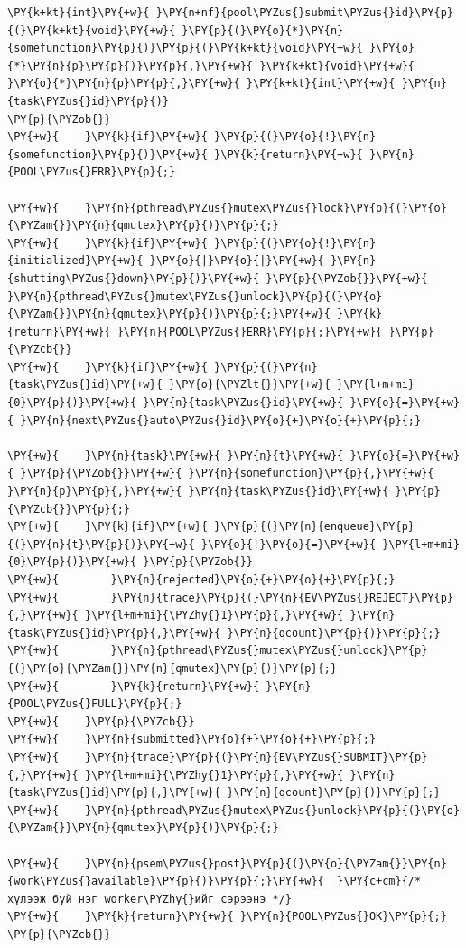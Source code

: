 \documentclass[12pt,a4paper]{article}
\begin{document}
\par\noindent\begin{minipage}{\linewidth}\setlength{\topsep}{1pt}\setlength{\partopsep}{0pt}
\label{lst:submit}
\begin{Verbatim}[commandchars=\\\{\}]
\PY{k+kt}{int}\PY{+w}{ }\PY{n+nf}{pool\PYZus{}submit\PYZus{}id}\PY{p}{(}\PY{k+kt}{void}\PY{+w}{ }\PY{p}{(}\PY{o}{*}\PY{n}{somefunction}\PY{p}{)}\PY{p}{(}\PY{k+kt}{void}\PY{+w}{ }\PY{o}{*}\PY{n}{p}\PY{p}{)}\PY{p}{,}\PY{+w}{ }\PY{k+kt}{void}\PY{+w}{ }\PY{o}{*}\PY{n}{p}\PY{p}{,}\PY{+w}{ }\PY{k+kt}{int}\PY{+w}{ }\PY{n}{task\PYZus{}id}\PY{p}{)}
\PY{p}{\PYZob{}}
\PY{+w}{    }\PY{k}{if}\PY{+w}{ }\PY{p}{(}\PY{o}{!}\PY{n}{somefunction}\PY{p}{)}\PY{+w}{ }\PY{k}{return}\PY{+w}{ }\PY{n}{POOL\PYZus{}ERR}\PY{p}{;}

\PY{+w}{    }\PY{n}{pthread\PYZus{}mutex\PYZus{}lock}\PY{p}{(}\PY{o}{\PYZam{}}\PY{n}{qmutex}\PY{p}{)}\PY{p}{;}
\PY{+w}{    }\PY{k}{if}\PY{+w}{ }\PY{p}{(}\PY{o}{!}\PY{n}{initialized}\PY{+w}{ }\PY{o}{|}\PY{o}{|}\PY{+w}{ }\PY{n}{shutting\PYZus{}down}\PY{p}{)}\PY{+w}{ }\PY{p}{\PYZob{}}\PY{+w}{ }\PY{n}{pthread\PYZus{}mutex\PYZus{}unlock}\PY{p}{(}\PY{o}{\PYZam{}}\PY{n}{qmutex}\PY{p}{)}\PY{p}{;}\PY{+w}{ }\PY{k}{return}\PY{+w}{ }\PY{n}{POOL\PYZus{}ERR}\PY{p}{;}\PY{+w}{ }\PY{p}{\PYZcb{}}
\PY{+w}{    }\PY{k}{if}\PY{+w}{ }\PY{p}{(}\PY{n}{task\PYZus{}id}\PY{+w}{ }\PY{o}{\PYZlt{}}\PY{+w}{ }\PY{l+m+mi}{0}\PY{p}{)}\PY{+w}{ }\PY{n}{task\PYZus{}id}\PY{+w}{ }\PY{o}{=}\PY{+w}{ }\PY{n}{next\PYZus{}auto\PYZus{}id}\PY{o}{+}\PY{o}{+}\PY{p}{;}

\PY{+w}{    }\PY{n}{task}\PY{+w}{ }\PY{n}{t}\PY{+w}{ }\PY{o}{=}\PY{+w}{ }\PY{p}{\PYZob{}}\PY{+w}{ }\PY{n}{somefunction}\PY{p}{,}\PY{+w}{ }\PY{n}{p}\PY{p}{,}\PY{+w}{ }\PY{n}{task\PYZus{}id}\PY{+w}{ }\PY{p}{\PYZcb{}}\PY{p}{;}
\PY{+w}{    }\PY{k}{if}\PY{+w}{ }\PY{p}{(}\PY{n}{enqueue}\PY{p}{(}\PY{n}{t}\PY{p}{)}\PY{+w}{ }\PY{o}{!}\PY{o}{=}\PY{+w}{ }\PY{l+m+mi}{0}\PY{p}{)}\PY{+w}{ }\PY{p}{\PYZob{}}
\PY{+w}{        }\PY{n}{rejected}\PY{o}{+}\PY{o}{+}\PY{p}{;}
\PY{+w}{        }\PY{n}{trace}\PY{p}{(}\PY{n}{EV\PYZus{}REJECT}\PY{p}{,}\PY{+w}{ }\PY{l+m+mi}{\PYZhy{}1}\PY{p}{,}\PY{+w}{ }\PY{n}{task\PYZus{}id}\PY{p}{,}\PY{+w}{ }\PY{n}{qcount}\PY{p}{)}\PY{p}{;}
\PY{+w}{        }\PY{n}{pthread\PYZus{}mutex\PYZus{}unlock}\PY{p}{(}\PY{o}{\PYZam{}}\PY{n}{qmutex}\PY{p}{)}\PY{p}{;}
\PY{+w}{        }\PY{k}{return}\PY{+w}{ }\PY{n}{POOL\PYZus{}FULL}\PY{p}{;}
\PY{+w}{    }\PY{p}{\PYZcb{}}
\PY{+w}{    }\PY{n}{submitted}\PY{o}{+}\PY{o}{+}\PY{p}{;}
\PY{+w}{    }\PY{n}{trace}\PY{p}{(}\PY{n}{EV\PYZus{}SUBMIT}\PY{p}{,}\PY{+w}{ }\PY{l+m+mi}{\PYZhy{}1}\PY{p}{,}\PY{+w}{ }\PY{n}{task\PYZus{}id}\PY{p}{,}\PY{+w}{ }\PY{n}{qcount}\PY{p}{)}\PY{p}{;}
\PY{+w}{    }\PY{n}{pthread\PYZus{}mutex\PYZus{}unlock}\PY{p}{(}\PY{o}{\PYZam{}}\PY{n}{qmutex}\PY{p}{)}\PY{p}{;}

\PY{+w}{    }\PY{n}{psem\PYZus{}post}\PY{p}{(}\PY{o}{\PYZam{}}\PY{n}{work\PYZus{}available}\PY{p}{)}\PY{p}{;}\PY{+w}{  }\PY{c+cm}{/* хүлээж буй нэг worker\PYZhy{}ийг сэрээнэ */}
\PY{+w}{    }\PY{k}{return}\PY{+w}{ }\PY{n}{POOL\PYZus{}OK}\PY{p}{;}
\PY{p}{\PYZcb{}}
\end{Verbatim}
\end{minipage}
\end{document}
